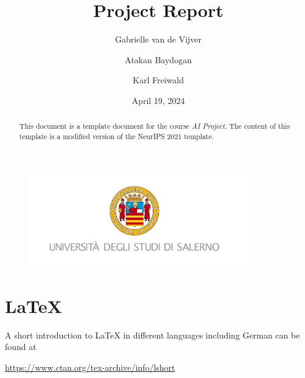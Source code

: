 \documentclass[abstract=true]{scrartcl}
\title{Project Report}
\author{Gabrielle van de Vijver \and Atakan Baydogan \and Karl Freiwald}
\date{April 19, 2024}
\begin{document}
\maketitle

\begin{figure}[h!]
	\centering
	\includegraphics[height=4.0cm]{./images/UNISA_Logo}
\end{figure}

\vfill %

\begin{abstract}
This document is a template document for the course \emph{AI Project}. The content of this template is a modified version of the NeurIPS 2021 template. 
\end{abstract}

\newpage

\section{LaTeX}
A short introduction to LaTeX in different languages including German can be found at 
\begin{center}
\url{https://www.ctan.org/tex-archive/info/lshort}
\end{center}



\end{document}
